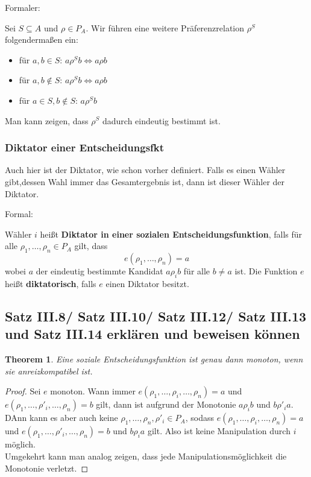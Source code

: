 \documentclass[]{article}
\newtheorem{thm}{Theorem}
\begin{document}
Formaler:

Sei $S \subseteq A$ und $\rho \in P_A$. Wir führen eine weitere Präferenzrelation $\rho^S$ folgendermaßen ein:
\begin{itemize}
	\item für $a,b \in S$: $a \rho^S b \Leftrightarrow a \rho b$
	\item für $a,b \notin S$: $a \rho^S b \Leftrightarrow a \rho b$
	\item für $a \in S, b \notin S$: $a \rho^S b$
\end{itemize}
Man kann zeigen, dass $\rho^S$ dadurch eindeutig bestimmt ist.

\subsubsection*{Diktator einer Entscheidungsfkt}
Auch hier ist der Diktator, wie schon vorher definiert. Falls es einen Wähler gibt,dessen Wahl immer das Gesamtergebnis ist, dann ist dieser Wähler der Diktator.

Formal:  

Wähler $i$ heißt \textbf{Diktator in einer sozialen Entscheidungsfunktion}, falls für alle $\rho_1, \dots, \rho_n \in P_A$ gilt, dass
\begin{equation*}
e(\rho_1,\dots, \rho_n) = a
\end{equation*}
wobei $a$ der eindeutig bestimmte Kandidat $a \rho_i b$ für alle $b \neq a$ ist. Die Funktion $e$ heißt \textbf{diktatorisch}, falls $e$ einen Diktator besitzt.

\subsection*{Satz III.8/ Satz III.10/ Satz III.12/ Satz III.13 und Satz III.14 erklären und beweisen können} 

\begin{thm}
		Eine soziale Entscheidungsfunktion ist genau dann monoton, wenn sie anreizkompatibel ist.
\end{thm}
\begin{proof}
	Sei $e$ monoton. Wann immer $e(\rho_1, \dots, \rho_i, \dots, \rho_n) = a$ und $e(\rho_1, \dots, \rho'_i, \dots, \rho_n) = b$ gilt,
	dann ist aufgrund der Monotonie $a \rho_i b $ und $ b \rho'_i a$. DAnn kann es aber auch keine $\rho_1, \dots, \rho_n, \rho'_i \in P_A$,
	sodass $e(\rho_1, \dots, \rho_i, \dots, \rho_n) = a$ und $e(\rho_1, \dots, \rho'_i, \dots, \rho_n) = b$ und $b \rho_i a$ gilt. Also ist keine Manipulation durch $i$ möglich. \\
	Umgekehrt kann man analog zeigen, dass jede Manipulationsmöglichkeit die Monotonie verletzt.
\end{proof}
\end{document}

